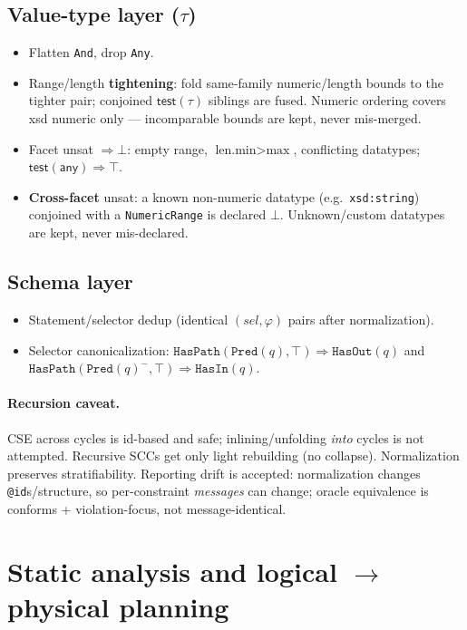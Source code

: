 \documentclass[11pt]{article}
\newcommand{\test}{\mathsf{test}}
\newcommand{\sel}{\mathit{sel}}
\newcommand{\code}[1]{\texttt{#1}}
\theoremstyle{definition}
\begin{document}
\subsection{Value-type layer ($\tau$)}
\begin{itemize}[leftmargin=1.4em]
  \item Flatten \code{And}, drop \code{Any}.
  \item Range/length \textbf{tightening}: fold same-family numeric/length bounds
  to the tighter pair; conjoined $\test(\tau)$ siblings are fused. Numeric
  ordering covers xsd numeric only --- incomparable bounds are kept, never
  mis-merged.
  \item Facet unsat $\Rightarrow\bot$: empty range, $\text{len.min}>\text{max}$,
  conflicting datatypes; $\test(\mathsf{any})\Rightarrow\top$.
  \item \textbf{Cross-facet} unsat: a known non-numeric datatype (e.g.\
  \code{xsd:string}) conjoined with a \code{NumericRange} is declared $\bot$.
  Unknown/custom datatypes are kept, never mis-declared.
\end{itemize}

\subsection{Schema layer}
\begin{itemize}[leftmargin=1.4em]
  \item Statement/selector dedup (identical $(\sel,\varphi)$ pairs after
  normalization).
  \item Selector canonicalization:
  $\code{HasPath}(\code{Pred}(q),\top)\Rightarrow\code{HasOut}(q)$ and
  $\code{HasPath}(\code{Pred}(q)^{-},\top)\Rightarrow\code{HasIn}(q)$.
\end{itemize}

\paragraph{Recursion caveat.} CSE across cycles is id-based and safe;
inlining/unfolding \emph{into} cycles is not attempted. Recursive SCCs get only
light rebuilding (no collapse). Normalization preserves stratifiability.
Reporting drift is accepted: normalization changes \code{@id}s/structure, so
per-constraint \emph{messages} can change; oracle equivalence is conforms +
violation-focus, not message-identical.

\section{Static analysis and logical $\to$ physical planning}\label{sec:plan}
\end{document}
